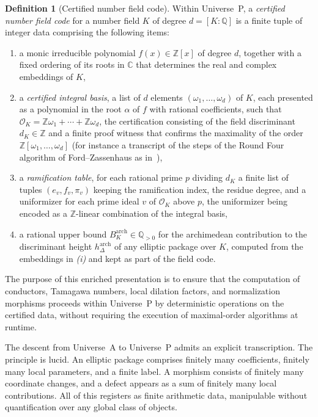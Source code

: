 \documentclass[10pt, reqno]{amsart}
\theoremstyle{plain}
\theoremstyle{definition}
\newtheorem{definition}[theorem]{Definition}
\theoremstyle{plain}
\newcommand{\Q}{\mathbb{Q}}
\newcommand{\Z}{\mathbb{Z}}
\newcommand{\C}{\mathbb{C}}
\begin{document}
\begin{definition}[Certified number field code]\label{def:CertifiedFieldCode}
Within Universe~P, a \emph{certified number field code} for a number field $K$ of degree $d = [K:\Q]$ is a finite tuple of integer data comprising the following items:
\begin{enumerate}
\item[\textit{(i)}] a monic irreducible polynomial $f(x) \in \Z[x]$ of degree $d$, together with a fixed ordering of its roots in $\C$ that determines the real and complex embeddings of $K$,
\item[\textit{(ii)}] a \emph{certified integral basis}, a list of $d$ elements $(\omega_1,\dots,\omega_d)$ of $K$, each presented as a polynomial in the root $\alpha$ of $f$ with rational coefficients, such that $\mathcal{O}_K = \Z\omega_1 + \cdots + \Z\omega_d$, the certification consisting of the field discriminant $d_K \in \Z$ and a finite proof witness that confirms the maximality of the order $\Z[\omega_1,\dots,\omega_d]$ (for instance a transcript of the steps of the Round Four algorithm of Ford--Zassenhaus as in~\cite{Cohen1993}),
\item[\textit{(iii)}] a \emph{ramification table}, for each rational prime $p$ dividing $d_K$ a finite list of tuples $(e_{v}, f_{v}, \pi_{v})$ keeping the ramification index, the residue degree, and a uniformizer for each prime ideal $v$ of $\mathcal{O}_K$ above $p$, the uniformizer being encoded as a $\Z$-linear combination of the integral basis,
\item[\textit{(iv)}] a rational upper bound $B_K^{\mathrm{arch}} \in \Q_{>0}$ for the archimedean contribution to the discriminant height $h_\Delta^{\mathrm{arch}}$ of any elliptic package over $K$, computed from the embeddings in \textit{(i)} and kept as part of the field code.
\end{enumerate}
The purpose of this enriched presentation is to ensure that the computation of conductors, Tamagawa numbers, local dilation factors, and normalization morphisms proceeds within Universe~P by deterministic operations on the certified data, without requiring the execution of maximal-order algorithms at runtime.
\end{definition}

The descent from Universe~A to Universe~P admits an explicit transcription. The principle is lucid. An elliptic package comprises finitely many coefficients, finitely many local parameters, and a finite label. A morphism consists of finitely many coordinate changes, and a defect appears as a sum of finitely many local contributions. All of this registers as finite arithmetic data, manipulable without quantification over any global class of objects.
\end{document}
